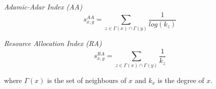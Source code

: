 \noindent
\textit{Adamic-Adar Index (AA)}
\begin{equation}
\label{eqn:adamic-adar}
s^{AA}_{x,y}=
\sum\limits_{z\in \Gamma(x) \cap \Gamma(y)}\frac{1}{log(k_{z})}
\end{equation}

\noindent
\textit{Resource Allocation Index (RA)}
\begin{equation}
\label{eqn:resource-allocation}
s^{RA}_{x,y}=
\sum\limits_{z\in \Gamma(x) \cap \Gamma(y)}\frac{1}{k_{z}}
\end{equation}


where $\Gamma(x)$ is the set of neighbours of $x$ and $k_{x}$ is the degree of $x$.
